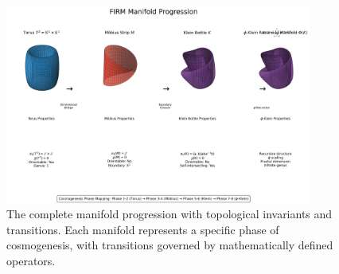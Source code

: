 \begin{figure}[H]
\centering
\includegraphics[width=0.9\textwidth]{figures/manifold_progression_diagram.png}
\caption{The complete manifold progression with topological invariants and transitions. Each manifold represents a specific phase of cosmogenesis, with transitions governed by mathematically defined operators.}
\label{fig:manifold_progression}
\end{figure}
